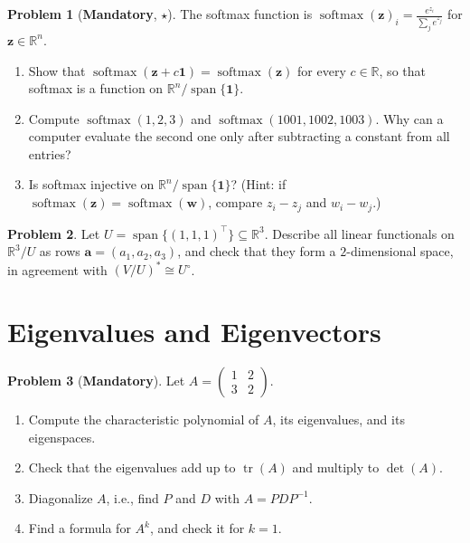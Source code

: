 \documentclass[11pt]{article}
\theoremstyle{definition}
\newtheorem{problem}{Problem}[section]
\newcommand{\mandatory}{\textcolor{red!70!black}{\textbf{Mandatory}}}
\DeclareMathOperator{\Span}{span}
\DeclareMathOperator{\tr}{tr}
\begin{document}
\begin{problem}[\mandatory, $\star$]\label{pr:softmax}
    The softmax function is $\operatorname{softmax}(\mathbf{z})_i = \frac{e^{z_i}}{\sum_j e^{z_j}}$ for $\mathbf{z} \in \mathbb{R}^n$.
    \begin{enumerate}[label=(\alph*)]
        \item Show that $\operatorname{softmax}(\mathbf{z} + c\mathbf{1}) = \operatorname{softmax}(\mathbf{z})$ for every $c \in \mathbb{R}$, so that softmax is a function on $\mathbb{R}^n/\Span\{\mathbf{1}\}$.
        \item Compute $\operatorname{softmax}(1, 2, 3)$ and $\operatorname{softmax}(1001, 1002, 1003)$. Why can a computer evaluate the second one only after subtracting a constant from all entries?
        \item Is softmax injective on $\mathbb{R}^n/\Span\{\mathbf{1}\}$? (Hint: if $\operatorname{softmax}(\mathbf{z}) = \operatorname{softmax}(\mathbf{w})$, compare $z_i - z_j$ and $w_i - w_j$.)
    \end{enumerate}
\end{problem}

\begin{problem}\label{pr:quotient-dual}
    Let $U = \Span\{(1, 1, 1)^\top\} \subseteq \mathbb{R}^3$. Describe all linear functionals on $\mathbb{R}^3/U$ as rows $\mathbf{a} = (a_1, a_2, a_3)$, and check that they form a $2$-dimensional space, in agreement with $(V/U)^* \cong U^\circ$.
\end{problem}

\section{Eigenvalues and Eigenvectors}

\begin{problem}[\mandatory]\label{pr:eig2}
    Let $A = \begin{pmatrix} 1 & 2 \\ 3 & 2 \end{pmatrix}$.
    \begin{enumerate}[label=(\alph*)]
        \item Compute the characteristic polynomial of $A$, its eigenvalues, and its eigenspaces.
        \item Check that the eigenvalues add up to $\tr(A)$ and multiply to $\det(A)$.
        \item Diagonalize $A$, i.e., find $P$ and $D$ with $A = PDP^{-1}$.
        \item Find a formula for $A^k$, and check it for $k = 1$.
    \end{enumerate}
\end{problem}
\end{document}
